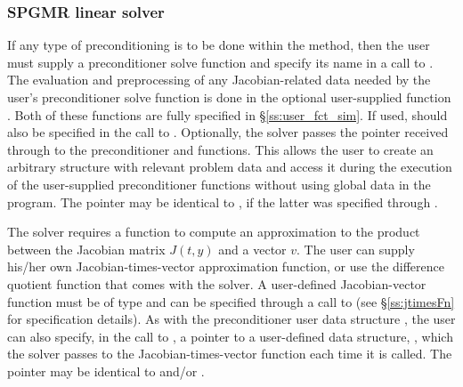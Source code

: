 \subsubsection{SPGMR linear solver}\label{sss:optin_spgmr}
If any type of preconditioning is to be done within the {\spgmr} method,
then the user must supply a preconditioner solve function 
and specify its name in a call to .
The evaluation and preprocessing of any Jacobian-related data needed
by the user's preconditioner solve function is done in the optional
user-supplied function . Both of these functions are
fully specified in \S\ref{ss:user_fct_sim}.
If used,  should also be specified in the call to
.
Optionally, the {\cvspgmr} solver passes the pointer 
received through  to the preconditioner
 and  functions.  This allows the user to create
an arbitrary structure with relevant problem data and access it during
the execution of the user-supplied preconditioner functions without
using global data in the program.  The pointer  may be
identical to , if the latter was specified through
.

The 
{\cvspgmr} solver requires a function to compute an approximation to the
product between the Jacobian matrix $J(t,y)$ and a vector $v$.
The user can supply his/her own Jacobian-times-vector approximation function, 
or use the difference quotient function  
that comes with the {\cvspgmr} solver.  A user-defined Jacobian-vector
function must be of type  and 
can be specified through a call to  
(see \S\ref{ss:jtimesFn} for specification details).
As with the preconditioner user data structure , the user
can also specify, in the call to , a pointer
to a user-defined data structure, , which the {\cvspgmr} solver
passes to the Jacobian-times-vector function  each time it is called.
The pointer  may be identical to  and/or .

